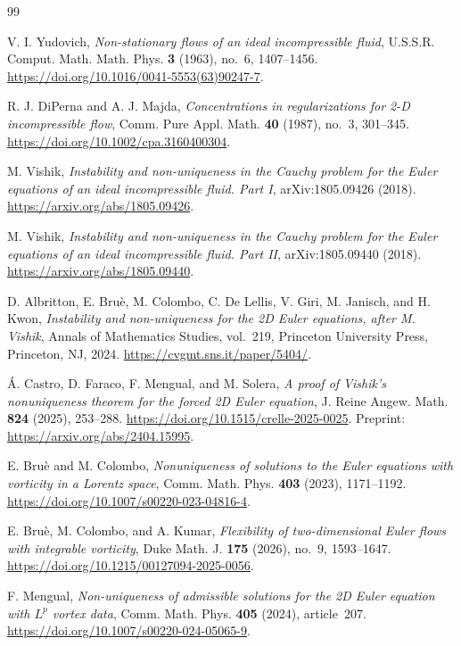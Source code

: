 \documentclass[11pt]{amsart}
\theoremstyle{remark}
\numberwithin{equation}{section}
\begin{document}
\begingroup
\raggedright
\begin{thebibliography}{99}

V. I. Yudovich,
\emph{Non-stationary flows of an ideal incompressible fluid},
U.S.S.R. Comput. Math. Math. Phys. \textbf{3} (1963), no.~6, 1407--1456.
\url{https://doi.org/10.1016/0041-5553(63)90247-7}.

R. J. DiPerna and A. J. Majda,
\emph{Concentrations in regularizations for 2-D incompressible flow},
Comm. Pure Appl. Math. \textbf{40} (1987), no.~3, 301--345.
\url{https://doi.org/10.1002/cpa.3160400304}.

M. Vishik,
\emph{Instability and non-uniqueness in the Cauchy problem for the
Euler equations of an ideal incompressible fluid. Part I},
arXiv:1805.09426 (2018).
\url{https://arxiv.org/abs/1805.09426}.

M. Vishik,
\emph{Instability and non-uniqueness in the Cauchy problem for the
Euler equations of an ideal incompressible fluid. Part II},
arXiv:1805.09440 (2018).
\url{https://arxiv.org/abs/1805.09440}.

D. Albritton, E. Bru\`e, M. Colombo, C. De Lellis, V. Giri,
M. Janisch, and H. Kwon,
\emph{Instability and non-uniqueness for the 2D Euler equations,
after M. Vishik},
Annals of Mathematics Studies, vol.~219,
Princeton University Press, Princeton, NJ, 2024.
\url{https://cvgmt.sns.it/paper/5404/}.

\'A. Castro, D. Faraco, F. Mengual, and M. Solera,
\emph{A proof of Vishik's nonuniqueness theorem for the forced
2D Euler equation},
J. Reine Angew. Math. \textbf{824} (2025), 253--288.
\url{https://doi.org/10.1515/crelle-2025-0025}.
Preprint: \url{https://arxiv.org/abs/2404.15995}.

E. Bru\`e and M. Colombo,
\emph{Nonuniqueness of solutions to the Euler equations with
vorticity in a Lorentz space},
Comm. Math. Phys. \textbf{403} (2023), 1171--1192.
\url{https://doi.org/10.1007/s00220-023-04816-4}.

E. Bru\`e, M. Colombo, and A. Kumar,
\emph{Flexibility of two-dimensional Euler flows with integrable vorticity},
Duke Math. J. \textbf{175} (2026), no.~9, 1593--1647.
\url{https://doi.org/10.1215/00127094-2025-0056}.

F. Mengual,
\emph{Non-uniqueness of admissible solutions for the 2D Euler
equation with $L^p$ vortex data},
Comm. Math. Phys. \textbf{405} (2024), article~207.
\url{https://doi.org/10.1007/s00220-024-05065-9}.


\end{thebibliography}
\end{document}
